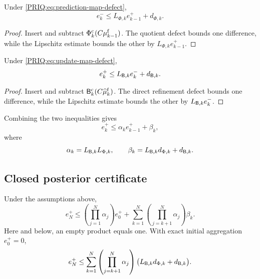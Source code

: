 \begin{PRIQlemma}\label{PRIQ:lem:prediction-step}
Under \eqref{PRIQ:eq:prediction-map-defect},
\begin{equation}\label{PRIQ:eq:prediction-step}
  e_k^-
  \leq
  L_{\Phi,k}e_{k-1}^+
  +d_{\Phi,k}.
\end{equation}
\end{PRIQlemma}

\begin{proof}
Insert and subtract $\Phi_k^{\mathrm c}(C\mu_{k-1}^{\mathrm f})$.  The quotient defect bounds one difference, while the Lipschitz estimate bounds the other by $L_{\Phi,k}e_{k-1}^+$.
\end{proof}

\begin{PRIQlemma}\label{PRIQ:lem:update-step}
Under \eqref{PRIQ:eq:update-map-defect},
\begin{equation}\label{PRIQ:eq:update-step}
  e_k^+
  \leq
  L_{\mathsf B,k}e_k^-
  +d_{\mathsf B,k}.
\end{equation}
\end{PRIQlemma}

\begin{proof}
Insert and subtract $\mathsf B_k^{\mathrm c}(C\widehat\mu_k^{\mathrm f})$.  The direct refinement defect bounds one difference, while the Lipschitz estimate bounds the other by $L_{\mathsf B,k}e_k^-$.
\end{proof}

Combining the two inequalities gives
\begin{equation}\label{PRIQ:eq:combined-step}
  e_k^+
  \leq
  \alpha_ke_{k-1}^++\beta_k,
\end{equation}
where
\begin{equation}\label{PRIQ:eq:alpha-beta}
  \alpha_k=L_{\mathsf B,k}L_{\Phi,k},
  \qquad
  \beta_k=L_{\mathsf B,k}d_{\Phi,k}+d_{\mathsf B,k}.
\end{equation}

\subsection{Closed posterior certificate}

\begin{PRIQtheorem}\label{PRIQ:thm:posterior-certificate}
Under the assumptions above,
\begin{equation}\label{PRIQ:eq:posterior-certificate}
  \boxed{
  e_N^+
  \leq
  \left(\prod_{j=1}^N\alpha_j\right)e_0^+
  +
  \sum_{k=1}^N
  \left(\prod_{j=k+1}^N\alpha_j\right)
  \beta_k.}
\end{equation}
Here and below, an empty product equals one.  With exact initial aggregation $e_0^+=0$,
\begin{equation}\label{PRIQ:eq:posterior-certificate-exact-initial}
  e_N^+
  \leq
  \sum_{k=1}^N
  \left(\prod_{j=k+1}^N\alpha_j\right)
  \bigl(L_{\mathsf B,k}d_{\Phi,k}+d_{\mathsf B,k}\bigr).
\end{equation}
\end{PRIQtheorem}

